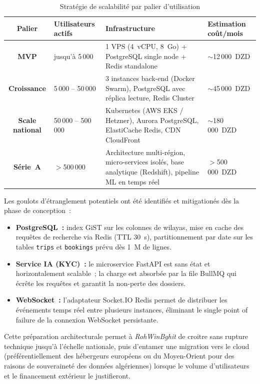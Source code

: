 \documentclass[12pt, a4paper, oneside]{report}
\begin{document}
\begin{table}[H]
\centering
\footnotesize
\begin{tabularx}{\textwidth}{|c|X|X|X|}
\hline
\rowcolor{rohlight}
\textbf{Palier} & \textbf{Utilisateurs actifs} & \textbf{Infrastructure} & \textbf{Estimation coût/mois} \\
\hline
\textbf{MVP} & jusqu'à 5\,000 & 1 VPS (4~vCPU, 8~Go) + PostgreSQL single node + Redis standalone & $\sim$12\,000~DZD \\
\hline
\textbf{Croissance} & 5\,000 -- 50\,000 & 3 instances back-end (Docker Swarm), PostgreSQL avec réplica lecture, Redis Cluster & $\sim$45\,000~DZD \\
\hline
\textbf{Scale national} & 50\,000 -- 500\,000 & Kubernetes (AWS EKS / Hetzner), Aurora PostgreSQL, ElastiCache Redis, CDN CloudFront & $\sim$180\,000~DZD \\
\hline
\textbf{Série~A} & $>$500\,000 & Architecture multi-région, micro-services isolés, base analytique (Redshift), pipeline ML en temps réel & $>$500\,000~DZD \\
\hline
\end{tabularx}
  \caption{Stratégie de scalabilité par palier d'utilisation}
  \label{tab:scalabilite}
\end{table}

Les goulots d'étranglement potentiels ont été identifiés et mitigationés dès la phase de conception~:
\begin{itemize}
  \item \textbf{PostgreSQL~:} index GiST sur les colonnes de wilayas, mise en cache des requêtes de recherche via Redis (TTL 30~s), partitionnement par date sur les tables \texttt{trips} et \texttt{bookings} prévu dès 1~M de lignes.
  \item \textbf{Service IA (KYC)~:} le microservice FastAPI est sans état et horizontalement scalable~; la charge est absorbée par la file BullMQ qui écrête les requêtes et garantit la non-perte des dossiers.
  \item \textbf{WebSocket~:} l'adaptateur Socket.IO Redis permet de distribuer les événements temps réel entre plusieurs instances, éliminant le single point of failure de la connexion WebSocket persistante.
\end{itemize}

Cette préparation architecturale permet à \textit{RohWinBghit} de croitre sans rupture technique jusqu'à l'échelle nationale, puis d'entamer une migration vers le cloud (préférentiellement des hébergeurs européens ou du Moyen-Orient pour des raisons de souveraineté des données algériennes) lorsque le volume d'utilisateurs et le financement extérieur le justifieront.
\end{document}
